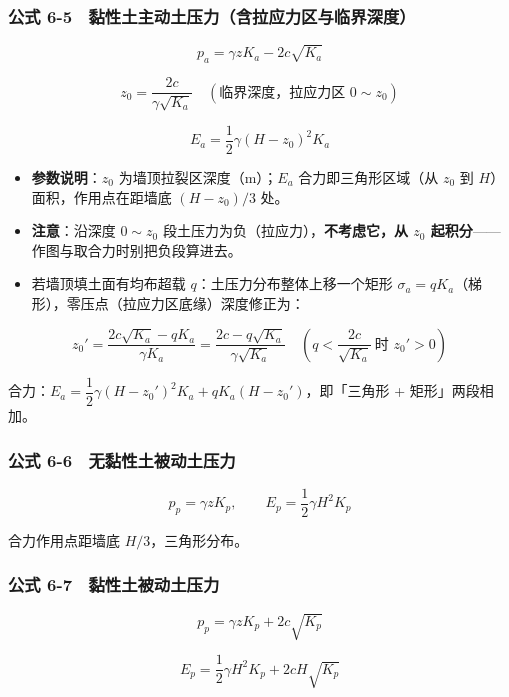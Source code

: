\documentclass[
]{article}
\providecommand{\tightlist}{%
  \setlength{\itemsep}{0pt}\setlength{\parskip}{0pt}}
\begin{document}
\subsubsection{公式
6-5　黏性土主动土压力（含拉应力区与临界深度）}\label{ux516cux5f0f-6-5-ux9ecfux6027ux571fux4e3bux52a8ux571fux538bux529bux542bux62c9ux5e94ux529bux533aux4e0eux4e34ux754cux6df1ux5ea6}

\[p_a=\gamma zK_a-2c\sqrt{K_a}\]

\[z_0=\frac{2c}{\gamma\sqrt{K_a}}\quad(\text{临界深度，拉应力区 }0\sim z_0)\]

\[E_a=\frac{1}{2}\gamma(H-z_0)^2K_a\]

\begin{itemize}
\tightlist
\item
  \textbf{参数说明}：\(z_0\) 为墙顶拉裂区深度（m）；\(E_a\)
  合力即三角形区域（从 \(z_0\) 到 \(H\)）面积，作用点在距墙底
  \((H-z_0)/3\) 处。
\item
  \textbf{注意}：沿深度 \(0\sim z_0\)
  段土压力为负（拉应力），\textbf{不考虑它，从 \(z_0\)
  起积分}------作图与取合力时别把负段算进去。
\item
  若墙顶填土面有均布超载 \(q\)：土压力分布整体上移一个矩形
  \(\sigma_a=qK_a\)（梯形），零压点（拉应力区底缘）深度修正为：
\end{itemize}

\[z_0'=\frac{2c\sqrt{K_a}-qK_a}{\gamma K_a}=\frac{2c-q\sqrt{K_a}}{\gamma\sqrt{K_a}}\quad(q<\frac{2c}{\sqrt{K_a}}\ \text{时 }z_0'>0)\]

合力：\(E_a=\dfrac{1}{2}\gamma(H-z_0')^2K_a+qK_a(H-z_0')\)，即「三角形 +
矩形」两段相加。

\subsubsection{公式
6-6　无黏性土被动土压力}\label{ux516cux5f0f-6-6-ux65e0ux9ecfux6027ux571fux88abux52a8ux571fux538bux529b}

\[p_p=\gamma zK_p,\qquad E_p=\frac{1}{2}\gamma H^2K_p\]

合力作用点距墙底 \(H/3\)，三角形分布。

\subsubsection{公式
6-7　黏性土被动土压力}\label{ux516cux5f0f-6-7-ux9ecfux6027ux571fux88abux52a8ux571fux538bux529b}

\[p_p=\gamma zK_p+2c\sqrt{K_p}\]

\[E_p=\frac{1}{2}\gamma H^2K_p+2cH\sqrt{K_p}\]
\end{document}
